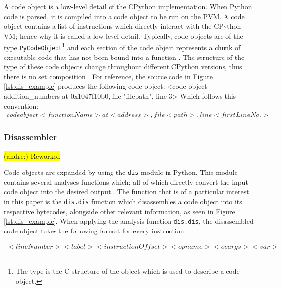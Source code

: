 \documentclass[12pt, a4paper]{report}
\DeclareRobustCommand{\andre}[1]{ {\begingroup\sethlcolor{BurntOrange}\hl{(andre:) #1}\endgroup} }
\newenvironment{code}
{\footnotesize\verbatim}{\endverbatim\normalfont}
\theoremstyle{definition}
\theoremstyle{definition}%
\theoremstyle{definition}%
\theoremstyle{definition}%
\theoremstyle{definition}%
\theoremstyle{definition}%
\begin{document}
{        \par A code object is a low-level detail of the CPython implementation. When Python code is parsed, it is compiled into a code object to be run on the PVM. A code object contains a list of instructions which
        directly interact with the CPython VM; hence why it is called a low-level detail. Typically, code objects are of the type \lstinline|PyCodeObject|\footnote{\label{lst:pycodeobj}The type is the C structure of the object which is used to describe a code object.}
        and each section of the code object represents a chunk of executable code that has not been bound into a function \cite{pythonofficial2022docspycode}. The structure of the type of these code 
        objects  change throughout different CPython versions, thus there is no set composition \cite{pythonofficial2022docspycode}. For reference, the source code in Figure \ref{lst:dis_example} produces
        the following code object: 
        \begin{code}
            <code object addition_numbers at 0x1047f10b0, file "filepath", line 3>
        \end{code}
        Which follows this convention:
        \small
        \begin{align}
            code object <functionName> at <address>, file <path>, line<firstLineNo.>
        \end{align}
        \normalsize

            \subsubsection*{Disassembler}
            \andre{Reworked}
            \par Code objects are expanded by using the \lstinline|dis| module in Python. This module contains several analyses functions which; all of which directly convert the input code object into the desired output \cite{pythonofficial2022docsdismodule}.
            The function that is of a particular interest in this paper is the \lstinline|dis.dis| function which disassembles a code object into its respective bytecodes, alongside other relevant information, as seen in Figure \ref*{lst:dis_example}.
            When applying the analysis function \lstinline|dis.dis|, the disassembled code object takes the following format for every instruction:
            
            \small
            \begin{align}
                <lineNumber><label><instructionOffset><opname><opargs><var>
            \end{align}
            \normalsize

}
\end{document}
